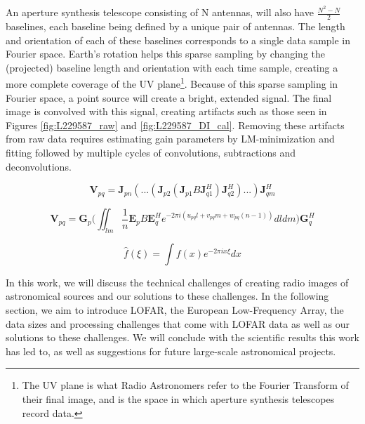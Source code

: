 An aperture synthesis telescope consisting of N antennas, will also have $\frac{N^2 -N}{2}$ baselines, each baseline being defined by a unique pair of antennas. The length and orientation of each of these baselines corresponds to a single data sample in Fourier space. Earth's rotation helps this sparse sampling by changing the (projected) baseline length and orientation with each time sample\citep{christiansen1987radiotelescopes}, creating a more complete coverage of the UV plane\footnote{The UV plane is what Radio Astronomers refer to the Fourier Transform of their final image, and is the space in which aperture synthesis telescopes record data.}. Because of this sparse sampling in Fourier space, a point source will create a bright, extended signal. The final image is convolved with this signal, creating artifacts such as those seen in Figures \ref{fig:L229587_raw} and \ref{fig:L229587_DI_cal}. Removing these artifacts from raw data requires estimating gain parameters by LM-minimization and fitting \cite{prefactor3_gasperin} followed by multiple cycles of convolutions, subtractions and deconvolutions\citep{Wendy_bootes, lofarfacet, tasseDDFacet}. 



\begin{equation}
    \bm{V}_{pq} = \bm{J}_{pn}(...(\bm{J}_{p2}(\bm{J}_{p1}B\bm{J}^H_{q1})\bm{J}^H_{q2})...)\bm{J}^H_{qm}
    \label{eq:RIME1}
\end{equation}


\begin{equation}
    \bm{V}_{pq} = \bm{G}_p \Bigg( \iint_{\mathit{lm}}\frac{1}{n} \bm{E}_p B \bm{E}^H_q e^{-2\pi i (u_{pq}l+v_{pq}m+w_{pq}(n-1))} d\mathit{l}d\mathit{m}\Bigg) \bm{G}^H_q
    \label{eq:RIME2}
\end{equation}


\begin{equation}
    \hat f(\xi) = \int f(x) e^{-2\pi i x \xi} dx 
    \label{eq:fourier}
\end{equation}

In this work, we will discuss the technical challenges of creating radio images of astronomical sources and our solutions to these challenges. In the following section, we aim to introduce LOFAR, the European Low-Frequency Array, the data sizes and processing challenges that come with LOFAR data as well as our solutions to these challenges. We will conclude with the scientific results this work has led to, as well as suggestions for future large-scale astronomical projects.

